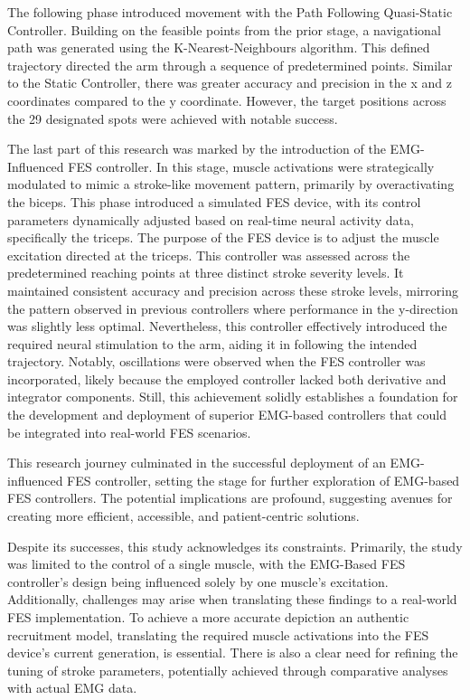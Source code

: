 The following phase introduced movement with the Path Following Quasi-Static Controller. Building on the feasible points from the prior stage, a navigational path was generated using the K-Nearest-Neighbours algorithm. This defined trajectory directed the arm through a sequence of predetermined points. Similar to the Static Controller, there was greater accuracy and precision in the x and z coordinates compared to the y coordinate. However, the target positions across the 29 designated spots were achieved with notable success.

The last part of this research was marked by the introduction of the EMG-Influenced FES controller. In this stage, muscle activations were strategically modulated to mimic a stroke-like movement pattern, primarily by overactivating the biceps. This phase introduced a simulated FES device, with its control parameters dynamically adjusted based on real-time neural activity data, specifically the triceps. The purpose of the FES device is to adjust the muscle excitation directed at the triceps. This controller was assessed across the predetermined reaching points at three distinct stroke severity levels. It maintained consistent accuracy and precision across these stroke levels, mirroring the pattern observed in previous controllers where performance in the y-direction was slightly less optimal. Nevertheless, this controller effectively introduced the required neural stimulation to the arm, aiding it in following the intended trajectory. Notably, oscillations were observed when the FES controller was incorporated, likely because the employed controller lacked both derivative and integrator components. Still, this achievement solidly establishes a foundation for the development and deployment of superior EMG-based controllers that could be integrated into real-world FES scenarios.

This research journey culminated in the successful deployment of an EMG-influenced FES controller, setting the stage for further exploration of EMG-based FES controllers. The potential implications are profound, suggesting avenues for creating more efficient, accessible, and patient-centric solutions.

Despite its successes, this study acknowledges its constraints. Primarily, the study was limited to the control of a single muscle, with the EMG-Based FES controller's design being influenced solely by one muscle's excitation. Additionally, challenges may arise when translating these findings to a real-world FES implementation. To achieve a more accurate depiction an authentic recruitment model, translating the required muscle activations into the FES device's current generation, is essential. There is also a clear need for refining the tuning of stroke parameters, potentially achieved through comparative analyses with actual EMG data.

